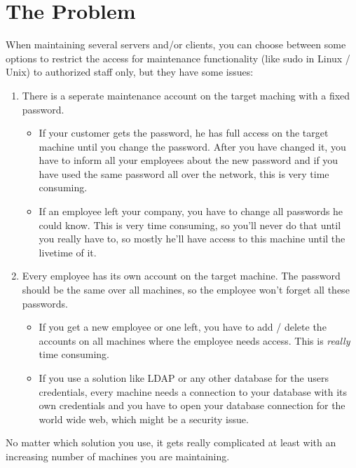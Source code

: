 %
%
%
%
%
%
%


\section{The Problem}

When maintaining several servers and/or clients, you can choose between some
options to restrict the access for maintenance functionality (like sudo in
Linux / Unix) to authorized staff only, but they have some issues:

\begin{enumerate}
	\item There is a seperate maintenance account on the target maching with a
		fixed password.
		\begin{itemize}
			\item If your customer gets the password, he has full access on the
				target machine until you change the password. After you have
				changed it, you have to inform all your employees about the new
				password and if you have used the same password all over the
				network, this is very time consuming.
			\item If an employee left your company, you have to change all
				passwords he could know. This is very time consuming, so you'll
				never do that until you really have to, so mostly he'll have
				access to this machine until the livetime of it.
		\end{itemize}

	\item Every employee has its own account on the target machine. The
		password should be the same over all machines, so the employee won't
		forget all these passwords.
		\begin{itemize}
			\item If you get a new employee or one left, you have to add /
				delete the accounts on all machines where the employee needs
				access. This is \textit{really} time consuming.
			\item If you use a solution like LDAP or any other database for
				the users credentials, every machine needs a connection to your
				database with its own credentials and you have to open your
				database connection for the world wide web, which might be a
				security issue.
		\end{itemize}
\end{enumerate}

No matter which solution you use, it gets really complicated at least with an
increasing number of machines you are maintaining.
